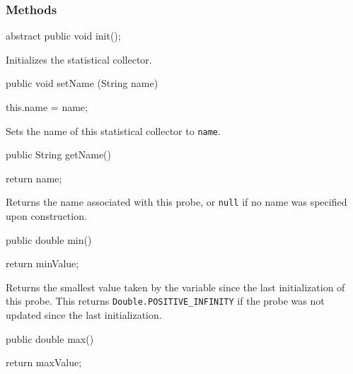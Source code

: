 \subsubsection* {Methods}
\begin{code}

   abstract public void init();
\end{code}
  \begin{tabb}  Initializes the statistical collector.
 \end{tabb}
\begin{code}

   public void setName (String name) \begin{hide} {
      this.name = name;
   } \end{hide}
\end{code}
  \begin{tabb} Sets the name of this statistical collector to \texttt{name}.
 \end{tabb}
\begin{code}

   public String getName()\begin{hide} {
      return name;
   }\end{hide}
\end{code}
\begin{tabb}   Returns the name associated with this probe,
   or \texttt{null} if no name was specified upon construction.
\end{tabb}
\begin{htmlonly}
\end{htmlonly}
\begin{code}

   public double min() \begin{hide} {
      return minValue;
   } \end{hide}
\end{code}
  \begin{tabb}  Returns the smallest value taken by the variable
   since the last initialization
   of this probe.
   This returns \texttt{Double.POSITIVE\_INFINITY}
   if the probe was not updated since the last initialization.
 \end{tabb}
\begin{htmlonly}
\end{htmlonly}
\begin{code}

   public double max() \begin{hide} {
      return maxValue;
   } \end{hide}
\end{code}
